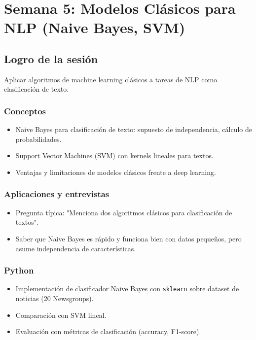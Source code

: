 \documentclass[12pt,a4paper,openany,oneside]{book}
\begin{document}
\chapter{Semana 5: Modelos Clásicos para NLP (Naive Bayes, SVM)}

\section{Logro de la sesión}
Aplicar algoritmos de machine learning clásicos a tareas de NLP como clasificación de texto.

\subsection{Conceptos}
\begin{itemize}
    \item Naive Bayes para clasificación de texto: supuesto de independencia, cálculo de probabilidades.
    \item Support Vector Machines (SVM) con kernels lineales para textos.
    \item Ventajas y limitaciones de modelos clásicos frente a deep learning.
\end{itemize}

\subsection{Aplicaciones y entrevistas}
\begin{itemize}
    \item Pregunta típica: "Menciona dos algoritmos clásicos para clasificación de textos".
    \item Saber que Naive Bayes es rápido y funciona bien con datos pequeños, pero asume independencia de características.
\end{itemize}

\subsection{Python}
\begin{itemize}
    \item Implementación de clasificador Naive Bayes con \texttt{sklearn} sobre dataset de noticias (20 Newsgroups).
    \item Comparación con SVM lineal.
    \item Evaluación con métricas de clasificación (accuracy, F1-score).
\end{itemize}
\end{document}
